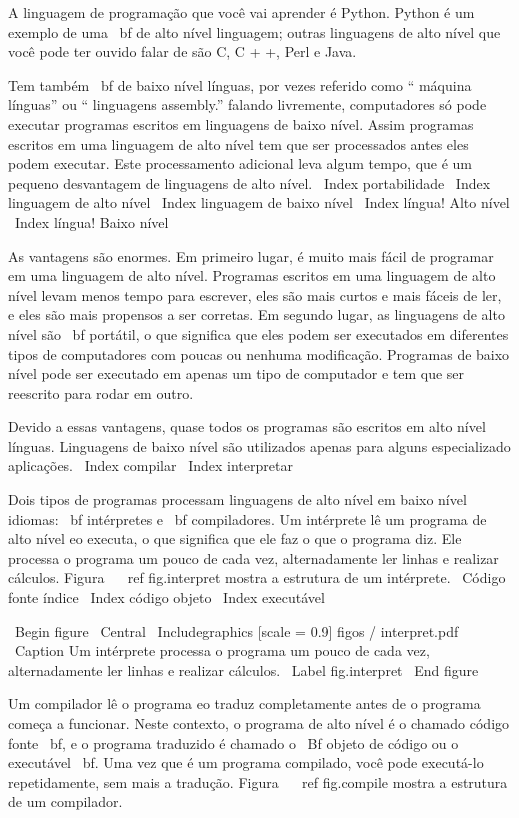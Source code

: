 \documentclass[10pt]{book}
\begin{document}
A linguagem de programação que você vai aprender é Python. Python é
um exemplo de uma {\ bf de alto nível linguagem}; outras linguagens de alto nível
que você pode ter ouvido falar de são C, C + +, Perl e Java.

Tem
também {\ bf de baixo nível línguas}, por vezes referido como `` máquina
línguas'' ou `` linguagens assembly.'' falando livremente, computadores
só pode executar programas escritos em linguagens de baixo nível. Assim
programas escritos em uma linguagem de alto nível tem que ser processados ​​antes
eles podem executar. Este processamento adicional leva algum tempo, que é um pequeno
desvantagem de linguagens de alto nível.
\ Index {} portabilidade
\ Index {linguagem de alto nível}
\ Index {linguagem de baixo nível}
\ Index {língua! Alto nível}
\ Index {língua! Baixo nível}

As vantagens são enormes. Em primeiro lugar, é muito mais fácil de programar
em uma linguagem de alto nível. Programas escritos em uma linguagem de alto nível
levam menos tempo para escrever, eles são mais curtos e mais fáceis de ler, e eles
são mais propensos a ser corretas. Em segundo lugar, as linguagens de alto nível são {\ bf
portátil}, o que significa que eles podem ser executados em diferentes tipos de computadores
com poucas ou nenhuma modificação. Programas de baixo nível pode ser executado em apenas um
tipo de computador e tem que ser reescrito para rodar em outro.

Devido a essas vantagens, quase todos os programas são escritos em alto nível
línguas. Linguagens de baixo nível são utilizados apenas para alguns especializado
aplicações.
\ Index {} compilar
\ Index {interpretar}

Dois tipos de programas processam linguagens de alto nível em baixo nível
idiomas: {\ bf intérpretes} e {\ bf compiladores}. Um intérprete
lê um programa de alto nível eo executa, o que significa que ele faz o que
o programa diz. Ele processa o programa um pouco de cada vez,
alternadamente ler linhas e realizar cálculos.
Figura ~ \ ref {fig.interpret} mostra a estrutura de um intérprete.
\ {Código fonte} índice
\ Index {código objeto}
\ Index {executável}

\ Begin {figure}
\ Central
{\ Includegraphics [scale = 0.9] {figos / interpret.pdf}}
\ Caption {Um intérprete processa o programa um pouco de cada vez,
alternadamente ler linhas e realizar cálculos.}
\ Label {} fig.interpret
\ End {figure}

Um compilador lê o programa eo traduz completamente antes de o
programa começa a funcionar. Neste contexto, o programa de alto nível é
o chamado código fonte {\ bf}, e o programa traduzido é chamado o
{\ Bf objeto de código} ou {o executável \ bf}. Uma vez que é um programa
compilado, você pode executá-lo repetidamente, sem mais a tradução.
Figura ~ \ ref {fig.compile} mostra a estrutura de um compilador.
\end{document}
